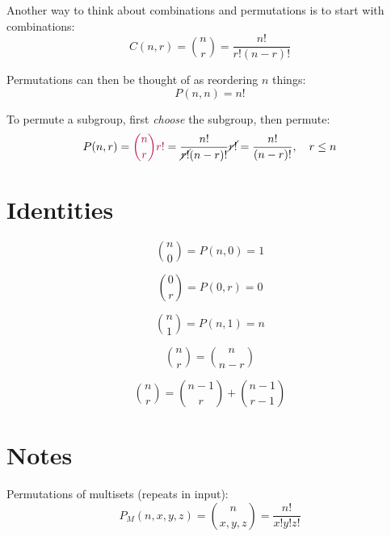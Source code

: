 \documentclass{article}
\begin{document}
    Another way to think about combinations and permutations is to start with combinations: \begin{equation}
        C(n, r) = {n \choose r} = \frac{n!}{r!(n - r)!}
    \end{equation}

    Permutations can then be thought of as reordering $n$ things: \begin{equation}
        P(n, n) = n!
    \end{equation}
        
    To permute a subgroup, first \textit{choose} the subgroup, then permute: \begin{equation}
        P(n, r) = \color{purple}{n \choose r}r!\color{black} = \frac{n!}{\cancel{r!}(n - r)!}\cancel{r!} = \frac{n!}{(n - r)!}, \quad r \leq n
    \end{equation}

    \section{Identities}
    
    \begin{equation}
        {n \choose 0} = P(n, 0) = 1
    \end{equation}

    \begin{equation}
        {0 \choose r} = P(0, r) = 0
    \end{equation}
    
    \begin{equation}
        {n \choose 1} = P(n, 1) = n
    \end{equation}
    
    \begin{equation}
        {n \choose r} = {n \choose n - r}
    \end{equation}

    \begin{equation}
        {n \choose r} = {n - 1 \choose r} + {n - 1 \choose r - 1}
    \end{equation}

    \section{Notes}

    Permutations of multisets (repeats in input): \begin{equation}
        P_M(n, x, y, z) = {n \choose x, y, z} = \frac{n!}{x!y!z!}
    \end{equation}
\end{document}
